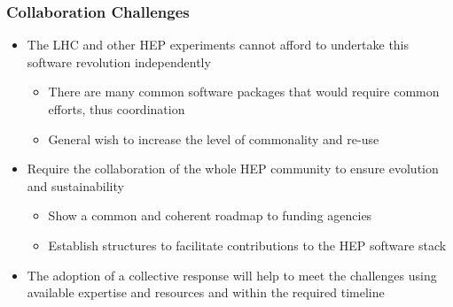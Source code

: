 \begin{frame}
\frametitle{Collaboration Challenges}

\begin{itemize}
\item The LHC and other HEP experiments cannot afford to undertake this software revolution independently
  \begin{itemize}
  \item There are many common software packages that would require common efforts, thus coordination
  \item General wish to increase the level of commonality and re-use
  \end{itemize}
\item Require the collaboration of the whole HEP community to ensure evolution and sustainability
  \begin{itemize}
  \item Show a common and coherent roadmap to funding agencies
  \item Establish structures to facilitate contributions to the HEP software stack 
  \end{itemize}
\item The adoption of a collective response will help to meet the challenges using available expertise and resources and within the required timeline
\end{itemize}

\end{frame}


